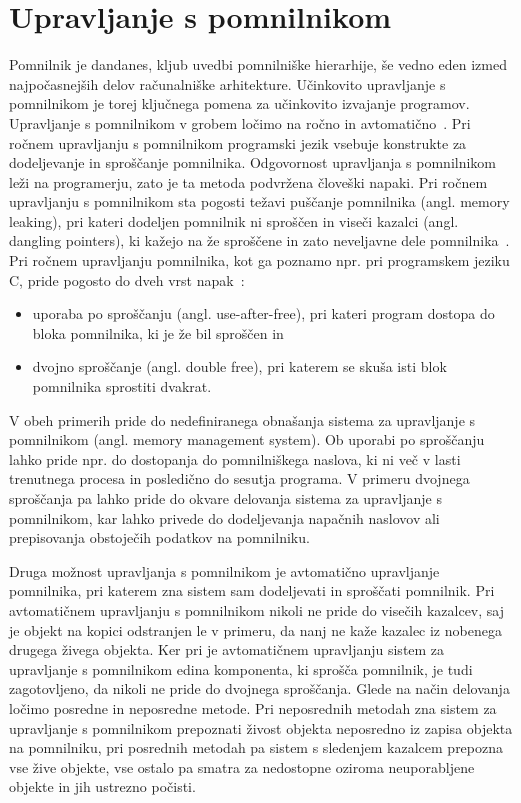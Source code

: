 \section{Upravljanje s pomnilnikom}

Pomnilnik je dandanes, kljub uvedbi pomnilniške hierarhije, še vedno eden izmed najpočasnejših delov računalniške arhitekture. Učinkovito upravljanje s pomnilnikom je torej ključnega pomena za učinkovito izvajanje programov. Upravljanje s pomnilnikom v grobem ločimo na ročno in avtomatično~\cite{jones2023garbage}. Pri ročnem upravljanju s pomnilnikom programski jezik vsebuje konstrukte za dodeljevanje in sproščanje pomnilnika. Odgovornost upravljanja s pomnilnikom leži na programerju, zato je ta metoda podvržena človeški napaki. Pri ročnem upravljanju s pomnilnikom sta pogosti težavi puščanje pomnilnika (angl. memory leaking), pri kateri dodeljen pomnilnik ni sproščen in viseči kazalci (angl. dangling pointers), ki kažejo na že sproščene in zato neveljavne dele pomnilnika~\cite{jones2023garbage}. Pri ročnem upravljanju pomnilnika, kot ga poznamo npr. pri programskem jeziku C, pride pogosto do dveh vrst napak~\cite{jones2023garbage}:

\begin{itemize}
	\itemsep 0em
	\item uporaba po sproščanju (angl. use-after-free), pri kateri program dostopa do bloka pomnilnika, ki je že bil sproščen in
	\item dvojno sproščanje (angl. double free), pri katerem se skuša isti blok pomnilnika sprostiti dvakrat.
\end{itemize}

V obeh primerih pride do nedefiniranega obnašanja sistema za upravljanje s pomnilnikom (angl. memory management system). Ob uporabi po sproščanju lahko pride npr. do dostopanja do pomnilniškega naslova, ki ni več v lasti trenutnega procesa in posledično do sesutja programa. V primeru dvojnega sproščanja pa lahko pride do okvare delovanja sistema za upravljanje s pomnilnikom, kar lahko privede do dodeljevanja napačnih naslovov ali prepisovanja obstoječih podatkov na pomnilniku.

Druga možnost upravljanja s pomnilnikom je avtomatično upravljanje pomnilnika, pri katerem zna sistem sam dodeljevati in sproščati pomnilnik. Pri avtomatičnem upravljanju s pomnilnikom nikoli ne pride do visečih kazalcev, saj je objekt na kopici odstranjen le v primeru, da nanj ne kaže kazalec iz nobenega drugega živega objekta. Ker pri je avtomatičnem upravljanju sistem za upravljanje s pomnilnikom edina komponenta, ki sprošča pomnilnik, je tudi zagotovljeno, da nikoli ne pride do dvojnega sproščanja. Glede na način delovanja ločimo posredne in neposredne metode. Pri neposrednih metodah zna sistem za upravljanje s pomnilnikom prepoznati živost objekta neposredno iz zapisa objekta na pomnilniku, pri posrednih metodah pa sistem s sledenjem kazalcem prepozna vse žive objekte, vse ostalo pa smatra za nedostopne oziroma neuporabljene objekte in jih ustrezno počisti.

